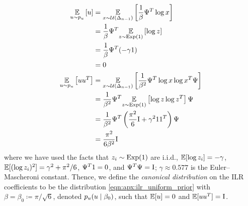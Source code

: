 \begin{align}
    \underset{u \sim p_{u}}{\mathbb{E}} \left[ u \right]          & = \underset{x \sim \mathcal{U}(\Delta_{n-1})}{\mathbb{E}} \left[ \frac{1}{\beta} \Psi^T \log x \right]                          \\
                                                                                 & = \frac{1}{\beta} \Psi^T \underset{z \sim \operatorname{Exp}(\mathrm{1})}{\mathbb{E}} \left[ \log z \right]                                \\
                                                                                 & = \frac{1}{\beta} \Psi^T (-\gamma \mathrm{1})                                                                                                       \\
                                                                                 & = \mathrm{0}                                                                                                                                            \\
    \underset{u \sim p_{u}}{\mathbb{E}} \left[ u u^T \right] & = \underset{x \sim \mathcal{U}(\Delta_{n-1})}{\mathbb{E}} \left[ \frac{1}{\beta^2} \Psi^T \log x \log x^T \Psi \right] \\
                                                                                 & = \frac{1}{\beta^2} \Psi^T \underset{z \sim \operatorname{Exp}(\mathrm{1})}{\mathbb{E}} \left[ \log z \log z^T \right] \Psi       \\
                                                                                 & = \frac{1}{\beta^2} \Psi^T \left( \frac{\pi^2}{6} \mathrm{I} + \gamma^2 \mathrm{1} \mathrm{1}^T \right) \Psi                                                \\
                                                                                 & = \frac{\pi^2}{6\beta^2} \mathrm{I}
\end{align}
where we have used the facts that $z_{i} \sim \operatorname{Exp}(1)$ are i.i.d.,
$\mathbb{E}[\log z_i] = -\gamma$,
$\mathbb{E}[(\log z_i)^2] = \gamma^2 + \pi^2/6$,
$\Psi^T \mathrm{1} = \mathrm{0}$,
and $\Psi^T \Psi = \mathrm{I}$;
$\gamma \approx 0.577$ is the Euler--Mascheroni constant.
Thence, we define the \textit{canonical distribution} on the \gls*{ILR} coefficients to be the distribution \eqref{eqn:apx:ilr_uniform_prior} with $\beta = \beta_{0} \coloneqq \pi / \sqrt{6}$, denoted $p_{u}(u \mid \beta_{0})$, such that $\mathbb{E}[u] = \mathrm{0}$ and $\mathbb{E}[u u^T] = \mathrm{I}$.

